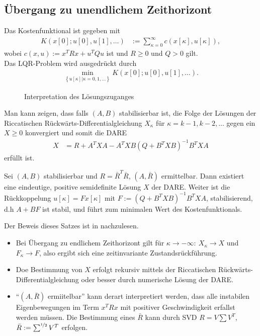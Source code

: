 \subsection{Übergang zu unendlichem Zeithorizont}
Das Kostenfunktional ist gegeben mit
\begin{align}
	K\left(x[0];u[0],u[1],\ldots \right) & := \sum\limits_{\kappa=0}^{\infty}c\left(x[\kappa],u[\kappa] \right),
\end{align}
wobei $c(x,u):=x^TRx + u^TQu$ ist und $R\geq 0$ und $Q>0$ gilt.\\
Das \ac{LQR}-Problem wird ausgedrückt durch
\begin{align*}
	\min\limits_{\left\{u[\kappa]|\kappa=0,1,\ldots \right\}} K\left(x[0];u[0],u[1],\ldots \right).
\end{align*} 
\begin{figure}[htb]
	\centering
	
	\caption{Interpretation des Lösungszuganges}
	\label{fig:kap_3_loesungszugang}
\end{figure}
Man kann zeigen, dass falls $(A,B)$ stabilisierbar ist, die Folge der Lösungen der Riccatischen Rückwärts-Differentialgleichung $X_{\kappa}$ für $\kappa=k-1,k-2,\ldots$ gegen ein $X\geq
0$ konvergiert und somit die
\ac{DARE} 
\begin{align*}
	X & = R + A^TXA - A^TXB\left(Q + B^TXB \right)^{-1}B^TXA
\end{align*}
erfüllt ist. 

\begin{satz}
Sei $(A,B)$ stabilisierbar und $R=\bar{R}^T\bar{R}$, $(A,\bar{R})$ ermittelbar. Dann existiert eine eindeutige, positive semidefinite Lösung $X$ der \ac{DARE}. Weiter ist die
Rückkoppelung $u[\kappa]=F x[\kappa]$ mit $F:=\left(Q+B^TXB \right)^{-1}B^TXA$, stabilisierend, d.h $A+BF$ ist stabil, und führt zum minimalen Wert des Kostenfunktionals.
\end{satz}
Der Beweis dieses Satzes ist in \cite{ludyk1995theoretische} nachzulesen.
\begin{remark}\hspace{1mm}
\begin{itemize}
  \item Bei Übergang zu endlichem Zeithorizont gilt für $\kappa\rightarrow -\infty:\ X_{\kappa}\rightarrow X$ und $F_{\kappa}\rightarrow F$, also ergibt sich eine zeitinvariante
  Zustandsrückführung.
  \item Doe Bestimmung von $X$ erfolgt rekursiv mittels der Riccatischen Rückwärts-Differentialgleichung oder besser durch numerische Lösung der \ac{DARE}.
  \item "`$(A,\bar{R})$ ermiitelbar"' kann derart interpretiert werden, dass alle instabilen Eigenbewegungen im Term $x^TRx$ mit positiver Geschwindigkeit erfallst werden müssen. Die
  Bestimmung eines $\bar{R}$ kann durch \ac{SVD} $R=V\sum V^T$, $\bar{R}:=\sum^{\nicefrac12}V^T$ erfolgen. 
\end{itemize}
\end{remark}


